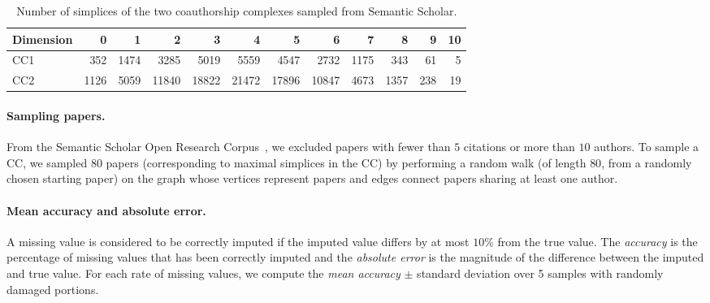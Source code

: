 \begin{table}[htbp]
  \centering
  \scriptsize{
  \begin{tabular}{lrrrrrrrrrrr}
    \toprule
    Dimension   & 0     & 1  & 2     & 3 & 4     & 5 & 6    & 7 & 8   & 9 & 10\\
    \midrule
    CC1 & 352  & 1474  & 3285  & 5019  & 5559  & 4547  & 2732  & 1175  & 343 & 61 & 5\\
    CC2 & 1126 & 5059 & 11840 & 18822 & 21472 & 17896  & 10847 & 4673 & 1357 & 238 & 19\\
    \bottomrule
  \end{tabular}}
  \vspace{2pt}
  \caption{%
  Number of simplices of the two coauthorship complexes sampled from Semantic Scholar.
  } \label{table:Simplices-coauthor}
\end{table}

\paragraph{Sampling papers.}
From the Semantic Scholar Open Research Corpus~\cite{ammar18NAACL}, we excluded papers with fewer than $5$ citations or more than $10$ authors.
To sample a CC, we sampled $80$ papers (corresponding to maximal simplices in the CC) by performing a random walk (of length $80$, from a randomly chosen starting paper) on the graph whose vertices represent papers and edges connect papers sharing at least one author.

\paragraph{Mean accuracy and absolute error.}
A missing value is considered to be correctly imputed if the imputed value differs by at most $10\%$ from the true value.
The \emph{accuracy} is the percentage of missing values that has been correctly imputed and the \emph{absolute error} is the magnitude of the difference between the imputed and true value.
For each rate of missing values, we compute the \emph{mean accuracy} $\pm$ standard deviation over 5 samples with randomly damaged portions.
